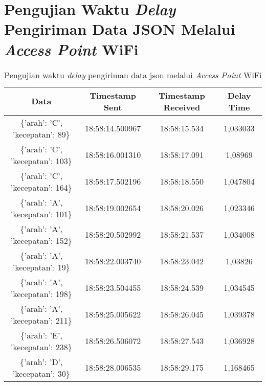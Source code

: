 \section{Pengujian Waktu \emph{Delay} Pengiriman Data JSON Melalui \emph{Access Point} WiFi}
\label{sec:delayWiFiJSON}

\begin{table}[H]
\centering
  \caption{Pengujian waktu \emph{delay} pengiriman data json melalui \emph{Access Point} WiFi}
  \label{tbl:delayWiFiJSON}
  \begin{tabular}{|ccc|c|}
    \hline
    \multicolumn{1}{|c|}{Data}                              & \multicolumn{1}{c|}{Timestamp Sent}  & Timestamp Received & Delay Time  \\ \hline
    \multicolumn{1}{|c|}{\{'arah': 'C', 'kecepatan': 89\}}  & \multicolumn{1}{c|}{18:58:14.500967} & 18:58:15.534       & 1,033033    \\ \hline
    \multicolumn{1}{|c|}{\{'arah': 'C', 'kecepatan': 103\}} & \multicolumn{1}{c|}{18:58:16.001310} & 18:58:17.091       & 1,08969     \\ \hline
    \multicolumn{1}{|c|}{\{'arah': 'C', 'kecepatan': 164\}} & \multicolumn{1}{c|}{18:58:17.502196} & 18:58:18.550       & 1,047804    \\ \hline
    \multicolumn{1}{|c|}{\{'arah': 'A', 'kecepatan': 101\}} & \multicolumn{1}{c|}{18:58:19.002654} & 18:58:20.026       & 1,023346    \\ \hline
    \multicolumn{1}{|c|}{\{'arah': 'A', 'kecepatan': 152\}} & \multicolumn{1}{c|}{18:58:20.502992} & 18:58:21.537       & 1,034008    \\ \hline
    \multicolumn{1}{|c|}{\{'arah': 'A', 'kecepatan': 19\}}  & \multicolumn{1}{c|}{18:58:22.003740} & 18:58:23.042       & 1,03826     \\ \hline
    \multicolumn{1}{|c|}{\{'arah': 'A', 'kecepatan': 198\}} & \multicolumn{1}{c|}{18:58:23.504455} & 18:58:24.539       & 1,034545    \\ \hline
    \multicolumn{1}{|c|}{\{'arah': 'A', 'kecepatan': 211\}} & \multicolumn{1}{c|}{18:58:25.005622} & 18:58:26.045       & 1,039378    \\ \hline
    \multicolumn{1}{|c|}{\{'arah': 'E', 'kecepatan': 238\}} & \multicolumn{1}{c|}{18:58:26.506072} & 18:58:27.543       & 1,036928    \\ \hline
    \multicolumn{1}{|c|}{\{'arah': 'D', 'kecepatan': 30\}}  & \multicolumn{1}{c|}{18:58:28.006535} & 18:58:29.175       & 1,168465    \\ \hline

\end{tabular}
\end{table}
